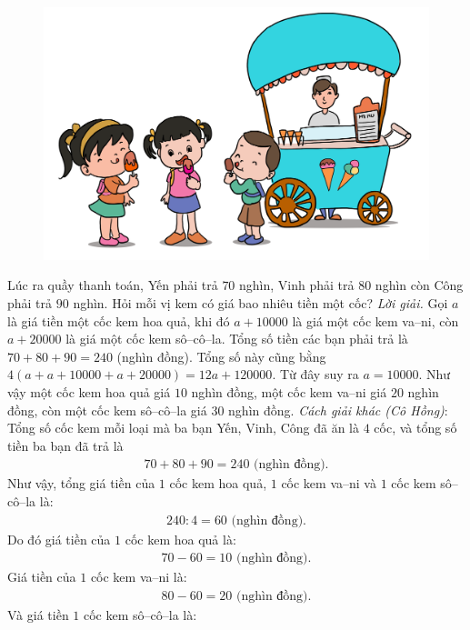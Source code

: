\begin{multicols}{2}
\begin{figure}[H]
		\vspace*{-10pt}
		\captionsetup{labelformat= empty, justification=centering}
		\includegraphics[width=0.92\linewidth]{bai2}
		\vspace*{-10pt}
	\end{figure}
	Lúc ra quầy thanh toán, Yến phải trả $70$ nghìn, Vinh phải trả $80$ nghìn còn Công phải trả $90$ nghìn. Hỏi mỗi vị kem có giá bao nhiêu tiền một cốc?
	\vskip 0.1cm
	\textit{Lời giải.} 	Gọi $a$ là giá tiền một cốc kem hoa quả, khi đó $a+10000$ là giá một cốc kem va--ni, còn $a+20000$ là giá một cốc kem sô--cô--la. Tổng số tiền các bạn phải trả là $70+80+90= 240$ (nghìn đồng). Tổng số này cũng bằng $4(a+a+10000+a+20000)= 12 a+ 120000$.
	\vskip 0.1cm 
	Từ đây suy ra $a= 10000$.
	\vskip 0.1cm 
	Như vậy một cốc kem hoa quả giá $10$ nghìn đồng, một cốc kem va--ni giá $20$ nghìn đồng, còn một cốc kem sô--cô--la giá $30$ nghìn đồng. 
	\vskip 0.1cm
	\textit{Cách giải khác (Cô Hồng)}: Tổng số cốc kem mỗi loại mà ba bạn Yến, Vinh, Công đã ăn là $4$ cốc, và tổng số tiền ba bạn đã trả là 
	\begin{align*}
		70 + 80 +90 = 240 \text{ (nghìn đồng).}
	\end{align*}
	Như vậy, tổng giá tiền của $1$ cốc kem hoa quả, $1$ cốc kem va--ni và $1$ cốc kem sô--cô--la là:
	\begin{align*}
		240 : 4=60 \text{ (nghìn đồng).}
	\end{align*}
	Do đó giá tiền của $1$ cốc kem hoa quả là:
	\begin{align*}
		70-60 = 10 \text{ (nghìn đồng).}
	\end{align*}
	Giá tiền của $1$ cốc kem va--ni là:
	\begin{align*}
		80-60 = 20 \text{ (nghìn đồng).}
	\end{align*}
	Và giá tiền $1$ cốc kem sô--cô--la là:

\end{multicols}
